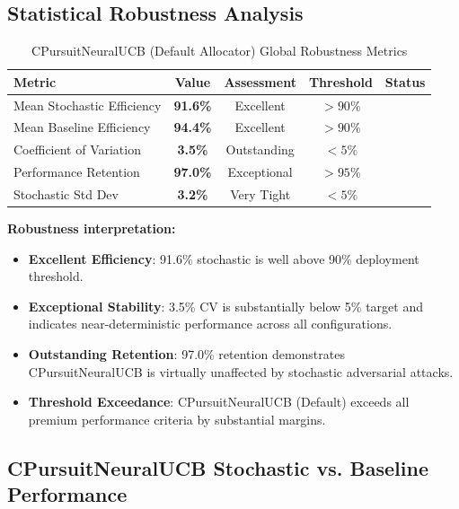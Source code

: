 \documentclass[12pt,a4paper]{article}
\newcommand{\success}[1]{\textcolor{accentgreen}{\textbf{#1}}}
\begin{document}
\subsection{Statistical Robustness Analysis}

\begin{table}[H]
\centering
\caption{CPursuitNeuralUCB (Default Allocator) Global Robustness Metrics}
\label{tab:robustness_default}
\begin{tabular}{@{}lcccc@{}}
\toprule
\textbf{Metric} & \textbf{Value} & \textbf{Assessment} & \textbf{Threshold} & \textbf{Status} \\
\midrule
Mean Stochastic Efficiency & \success{91.6\%} & Excellent & $>90\%$ & \success{\checkmark} \\
Mean Baseline Efficiency & \success{94.4\%} & Excellent & $>90\%$ & \success{\checkmark} \\
Coefficient of Variation & \success{3.5\%} & Outstanding & $<5\%$ & \success{\checkmark} \\
Performance Retention & \success{97.0\%} & Exceptional & $>95\%$ & \success{\checkmark} \\
Stochastic Std Dev & \success{3.2\%} & Very Tight & $<5\%$ & \success{\checkmark} \\
\bottomrule
\end{tabular}
\end{table}

\textbf{Robustness interpretation:}

\begin{itemize}
    \item \success{Excellent Efficiency}: 91.6\% stochastic is well above 90\% deployment threshold.
    
    \item \success{Exceptional Stability}: 3.5\% CV is substantially below 5\% target and indicates near-deterministic performance across all configurations.
    
    \item \success{Outstanding Retention}: 97.0\% retention demonstrates CPursuitNeuralUCB is virtually unaffected by stochastic adversarial attacks.
    
    \item \success{Threshold Exceedance}: CPursuitNeuralUCB (Default) exceeds all premium performance criteria by substantial margins.
\end{itemize}

\subsection{CPursuitNeuralUCB Stochastic vs. Baseline Performance}
\end{document}
